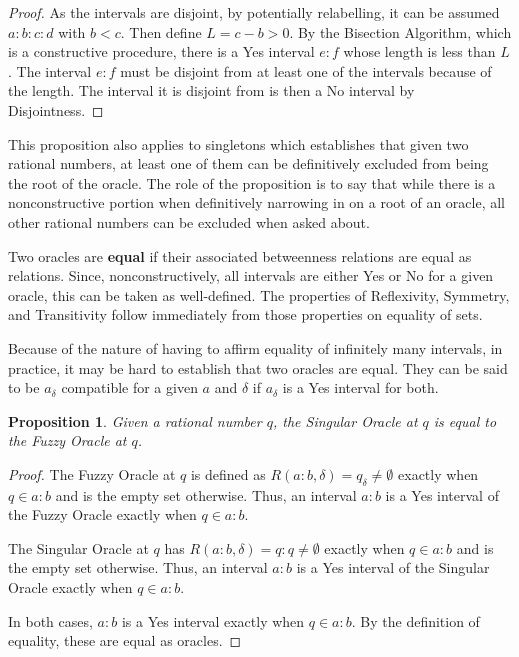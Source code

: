 \documentclass[12pt]{article}
\newtheorem{proposition}{Proposition}[section]
\begin{document}
\begin{proof}
    As the intervals are disjoint, by potentially relabelling, it can be assumed $a:b:c:d$ with $b < c$. Then define $L = c-b > 0$. By the Bisection Algorithm, which is a constructive procedure, there is a Yes interval $e:f$ whose length is less than $L$. The interval $e:f$ must be disjoint from at least one of the intervals because of the length. The interval it is disjoint from is then a No interval by Disjointness. 
\end{proof}

This proposition also applies to singletons which establishes that given two rational numbers, at least one of them can be definitively excluded from being the root of the oracle. The role of the proposition is to say that while there is a nonconstructive portion when definitively narrowing in on a root of an oracle, all other rational numbers can be excluded when asked about. 

Two oracles are \textbf{equal} if their associated betweenness relations are equal as relations. Since, nonconstructively, all intervals are either Yes or No for a given oracle, this can be taken as well-defined. The properties of Reflexivity, Symmetry, and Transitivity follow immediately from those properties on equality of sets. 

Because of the nature of having to affirm equality of infinitely many intervals, in practice, it may be hard to establish that two oracles are equal. They can be said to be $a_\delta$ compatible for a given $a$ and $\delta$ if $a_\delta$ is a Yes interval for both. 

\begin{proposition}
    Given a rational number $q$, the Singular Oracle at $q$ is equal to the Fuzzy Oracle at $q$. 
\end{proposition}

\begin{proof}
    The Fuzzy Oracle at $q$ is defined as $R(a:b, \delta) = q_\delta \neq \emptyset$ exactly when $q \in a:b$ and is the empty set otherwise. Thus, an interval $a:b$ is a Yes interval of the Fuzzy Oracle exactly when $q \in a:b$. 
    
    The Singular Oracle at $q$ has $R(a:b, \delta) = q:q \neq \emptyset $ exactly when $q \in a:b$ and is the empty set otherwise. Thus, an interval $a:b$ is a Yes interval of the Singular Oracle exactly when $q \in a:b$.

    In both cases, $a:b$ is a Yes interval exactly when $q \in a:b$. By the definition of equality, these are equal as oracles. 
\end{proof}
\end{document}
